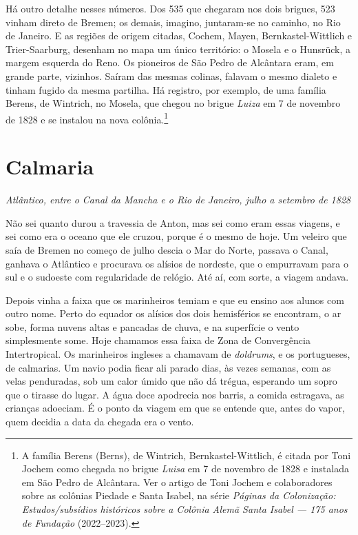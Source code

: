 \documentclass[
  brazilian,
  11pt,
  openany]{book}
\begin{document}
Há outro detalhe nesses números. Dos 535 que chegaram nos dois brigues,
523 vinham direto de Bremen; os demais, imagino, juntaram-se no caminho,
no Rio de Janeiro. E as regiões de origem citadas, Cochem, Mayen,
Bernkastel-Wittlich e Trier-Saarburg, desenham no mapa um único
território: o Mosela e o Hunsrück, a margem esquerda do Reno. Os
pioneiros de São Pedro de Alcântara eram, em grande parte, vizinhos.
Saíram das mesmas colinas, falavam o mesmo dialeto e tinham fugido da
mesma partilha. Há registro, por exemplo, de uma família Berens, de
Wintrich, no Mosela, que chegou no brigue \emph{Luiza} em 7 de novembro
de 1828 e se instalou na nova colônia.\footnote{A família Berens
  (Berns), de Wintrich, Bernkastel-Wittlich, é citada por Toni Jochem
  como chegada no brigue \emph{Luisa} em 7 de novembro de 1828 e
  instalada em São Pedro de Alcântara. Ver o artigo de Toni Jochem e
  colaboradores sobre as colônias Piedade e Santa Isabel, na série
  \emph{Páginas da Colonização: Estudos/subsídios históricos sobre a
  Colônia Alemã Santa Isabel --- 175 anos de Fundação} (2022--2023).}

\section{Calmaria}\label{calmaria}

\emph{Atlântico, entre o Canal da Mancha e o Rio de Janeiro, julho a
setembro de 1828}

Não sei quanto durou a travessia de Anton, mas sei como eram essas
viagens, e sei como era o oceano que ele cruzou, porque é o mesmo de
hoje. Um veleiro que saía de Bremen no começo de julho descia o Mar do
Norte, passava o Canal, ganhava o Atlântico e procurava os alísios de
nordeste, que o empurravam para o sul e o sudoeste com regularidade de
relógio. Até aí, com sorte, a viagem andava.

Depois vinha a faixa que os marinheiros temiam e que eu ensino aos
alunos com outro nome. Perto do equador os alísios dos dois hemisférios
se encontram, o ar sobe, forma nuvens altas e pancadas de chuva, e na
superfície o vento simplesmente some. Hoje chamamos essa faixa de Zona
de Convergência Intertropical. Os marinheiros ingleses a chamavam de
\emph{doldrums}, e os portugueses, de calmarias. Um navio podia ficar
ali parado dias, às vezes semanas, com as velas penduradas, sob um calor
úmido que não dá trégua, esperando um sopro que o tirasse do lugar. A
água doce apodrecia nos barris, a comida estragava, as crianças
adoeciam. É o ponto da viagem em que se entende que, antes do vapor,
quem decidia a data da chegada era o vento.
\end{document}

